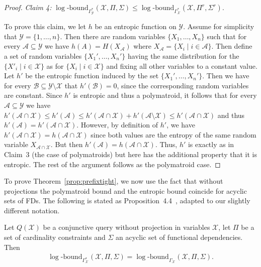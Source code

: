 \documentclass[a4paper,cleveref]{lipics-v2021}
\newcommand{\logb}{\mathrm{\log\text{-}bound}}
\newcommand{\vset}[1]{\mathcal{#1}}
\begin{document}
\begin{proof}
\smallskip
	 
\emph{Claim 4:}	
	 $\logb_{\Gamma^*_{\vset Y}}(\vset X, \Pi, \Sigma) \le \logb_{\Gamma^*_{\vset X}}(\vset X, \Pi^r, \Sigma^r)$.
	 
	 To prove this claim, we  let $h$ be an entropic function on $\vset Y$. Assume for simplicity that $\vset Y = \{1, \ldots, n\}$. Then there are random variables $\{X_1 , \ldots, X_n\}$ such that for every $\mathcal A\subseteq \vset Y$ we have $h(A) = H(X_{\vset A})$ where $X_{\vset A} = \{X_i\mid i\in \vset A\}$. Then define a set of random variables $\{X_1', \ldots, X_n'\}$ having the same distribution for the $\{X'_i\mid i\in \vset X\}$ as for $\{X_i\mid i\in \vset X\}$ and fixing all other variables to a constant value. Let $h'$ be the entropic function induced by the set $\{X_1', \ldots, X_n' \}$. Then we have for every $\vset B \subseteq \vset Y \setminus\vset X$ that $h'(\vset B) = 0$, since the corresponding random variables are constant. Since $h'$ is entropic and thus a polymatroid, it follows that for every $\vset A \subseteq \vset Y$ we have $h'(\vset A \cap \vset X) \le h'(\vset A) \le  h'(\vset A \cap \vset X) + h'(\vset A \setminus \vset X) \le h'(\vset A \cap \vset X)$ and thus $h'(\vset A) = h'(\vset A \cap \vset X)$. However, by definition of $h'$, we have $h'(\vset A\cap \vset X) = h(\vset A\cap \vset X)$ since both values are the entropy of the same random variable $X_{\vset A\cap \vset X}$. But then $h'(\vset A) = h(\vset A\cap \vset X)$. Thus, $h'$ is exactly as in 
	 Claim~3 (the case of polymatroids) but here has the additional property that it is entropic. The rest of the argument follows as the polymatroid case.
\end{proof}

To prove Theorem~\ref{prop:prefixtight}, we now use the fact that without projections the polymatroid bound and the entropic bound coincide for acyclic sets of FDs. The following is stated as Proposition~4.4~\cite{ngo2018worstb}, adapted to our slightly different notation.
\begin{proposition}\label{prop:ngo}
Let $Q(\vset X)$ be a conjunctive query without projection in variables $\vset X$, let $\Pi$ be a set of cardinality constraints and $\Sigma$ an acyclic set of functional dependencies. Then
\begin{align*}
	\logb_{\Gamma^*_{\vset X}}(\vset X, \Pi, \Sigma) = \logb_{\Gamma_{\vset X}}(\vset X, \Pi, \Sigma).
\end{align*} 
\end{proposition}
\end{document}
